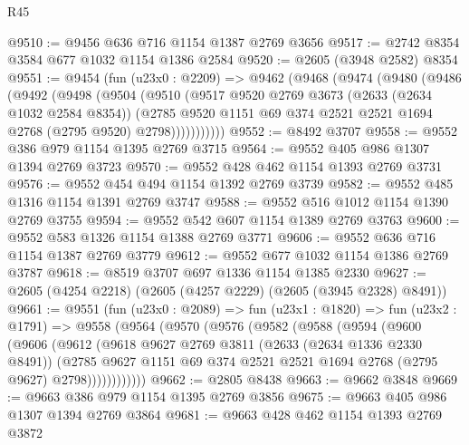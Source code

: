 \begin{lexlean}{R45}
\begin{coremodule}
@9510 := @9456 @636 @716 @1154 @1387 @2769 @3656
@9517 := @2742 @8354 @3584 @677 @1032 @1154 @1386 @2584
@9520 := @2605 (@3948 @2582) @8354
@9551 := @9454
    (fun (u23x0 : @2209) =>
    @9462
      (@9468
        (@9474
          (@9480
            (@9486
              (@9492
                (@9498
                  (@9504
                    (@9510
                      (@9517
                        @9520
                        @2769
                        @3673
                        (@2633 (@2634 @1032 @2584 @8354))
                        (@2785
                          @9520
                          @1151
                          @69
                          @374
                          @2521
                          @2521
                          @1694
                          @2768
                          (@2795 @9520)
                          @2798)))))))))))
@9552 := @8492 @3707
@9558 := @9552 @386 @979 @1154 @1395 @2769 @3715
@9564 := @9552 @405 @986 @1307 @1394 @2769 @3723
@9570 := @9552 @428 @462 @1154 @1393 @2769 @3731
@9576 := @9552 @454 @494 @1154 @1392 @2769 @3739
@9582 := @9552 @485 @1316 @1154 @1391 @2769 @3747
@9588 := @9552 @516 @1012 @1154 @1390 @2769 @3755
@9594 := @9552 @542 @607 @1154 @1389 @2769 @3763
@9600 := @9552 @583 @1326 @1154 @1388 @2769 @3771
@9606 := @9552 @636 @716 @1154 @1387 @2769 @3779
@9612 := @9552 @677 @1032 @1154 @1386 @2769 @3787
@9618 := @8519 @3707 @697 @1336 @1154 @1385 @2330
@9627 := @2605 (@4254 @2218) (@2605 (@4257 @2229) (@2605 (@3945 @2328) @8491))
@9661 := @9551
    (fun (u23x0 : @2089) =>
    fun (u23x1 : @1820) =>
    fun (u23x2 : @1791) =>
    @9558
      (@9564
        (@9570
          (@9576
            (@9582
              (@9588
                (@9594
                  (@9600
                    (@9606
                      (@9612
                        (@9618
                          @9627
                          @2769
                          @3811
                          (@2633 (@2634 @1336 @2330 @8491))
                          (@2785
                            @9627
                            @1151
                            @69
                            @374
                            @2521
                            @2521
                            @1694
                            @2768
                            (@2795 @9627)
                            @2798))))))))))))
@9662 := @2805 @8438
@9663 := @9662 @3848
@9669 := @9663 @386 @979 @1154 @1395 @2769 @3856
@9675 := @9663 @405 @986 @1307 @1394 @2769 @3864
@9681 := @9663 @428 @462 @1154 @1393 @2769 @3872

\end{coremodule}
\end{lexlean}
